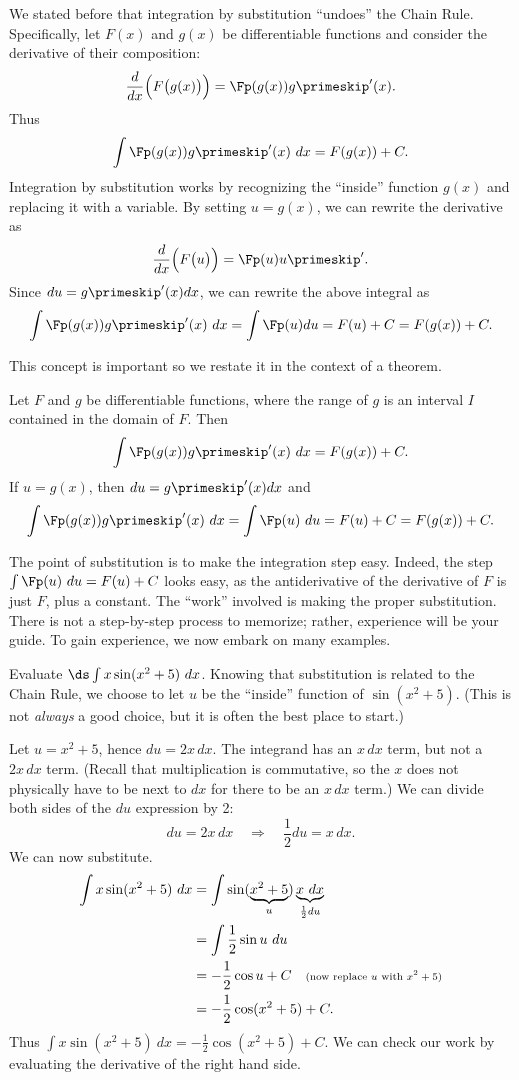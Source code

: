 We stated before that integration by substitution ``undoes'' the Chain Rule. Specifically, let $F(x)$ and $g(x)$ be differentiable functions and consider the derivative of their composition:
\[\frac{d}{dx}\Bigl(F\bigl(g(x)\bigr)\Bigr) = \Fp(g(x))g\primeskip'(x).\]
Thus 
\[\int \Fp(g(x))g\primeskip'(x)\ dx = F(g(x)) + C.\]
Integration by substitution works by recognizing the ``inside'' function $g(x)$ and replacing it with a variable. By setting $u=g(x)$, we can rewrite the derivative as
\[\frac{d}{dx}\Bigl(F\bigl(u\bigr)\Bigr) = \Fp(u)u\primeskip'.\]
Since $du = g\primeskip'(x)dx$, we can rewrite the above integral as
\[\int \Fp(g(x))g\primeskip'(x)\ dx = \int \Fp(u) du = F(u)+C = F(g(x))+ C.\]
	
This concept is important so we restate it in the context of a theorem.

\begin{theorem}\label{thm:subst}
Let $F$ and $g$ be differentiable functions, where the range of $g$ is an interval $I$ contained in the domain of $F$. Then 
\[\int \Fp(g(x))g\primeskip'(x)\ dx = F(g(x)) + C.\]
If $u = g(x)$, then $du = g\primeskip'(x)dx$ and 
\[\int \Fp(g(x))g\primeskip'(x)\ dx = \int \Fp(u)\ du = F(u)+C = F(g(x))+C.\]
\end{theorem}

The point of substitution is to make the integration step easy. Indeed, the step $\int \Fp(u)\ du = F(u) + C$ looks easy, as the antiderivative of the derivative of $F$ is just $F$, plus a constant. The ``work'' involved is making the proper substitution. There is not a step-by-step process to memorize; rather, experience will be your guide. To gain experience, we now embark on many examples.


\begin{example}\label{ex_sub1}
Evaluate $\ds \int x\sin(x^2+5)\ dx$.
\solution
Knowing that substitution is related to the Chain Rule, we choose to let $u$ be the ``inside'' function of $\sin(x^2+5)$. (This is not \emph{always} a good choice, but it is often the best place to start.)

Let $u = x^2+5$, hence $du = 2x\,dx$. The integrand has an $x\,dx$ term, but not a $2x\,dx$ term. (Recall that multiplication is commutative, so the $x$ does not physically have to be next to $dx$ for there to be an $x\,dx$ term.) We can divide both sides of the $du$ expression by 2:
\[du = 2x\,dx \quad \Rightarrow \quad \frac12du = x\,dx.\]
We can now substitute.
\begin{align*}
	\int x\sin(x^2+5)\ dx
	&= \int \sin(\underbrace{x^2+5}_u) \underbrace{x\ dx}_{\frac12du}\\
	&= \int \frac12\sin u\ du \\
	&= -\frac12\cos u + C \quad \text{\scriptsize (now replace $u$ with $x^2+5$)}\\
	&=-\frac12\cos(x^2+5) + C.
\end{align*}
Thus $\int x\sin(x^2+5)\ dx = -\frac12\cos(x^2+5)+C$. We can check our work by evaluating the derivative of the right hand side.
\end{example}

